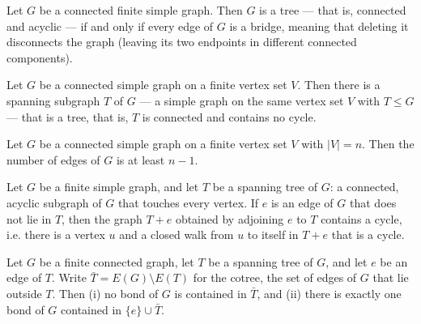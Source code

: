\begin{theorem}
\label{SimpleGraph.connected_isTree_iff_forall_edge_isBridge}
\leanok
Let $G$ be a connected finite simple graph. Then $G$ is a tree — that is, connected and
acyclic — if and only if every edge of $G$ is a bridge, meaning that deleting it
disconnects the graph (leaving its two endpoints in different connected components).
\end{theorem}

\begin{theorem}
\label{SimpleGraph.exists_spanningTree}
\leanok
Let $G$ be a connected simple graph on a finite vertex set $V$. Then there is a spanning
subgraph $T$ of $G$ — a simple graph on the same vertex set $V$ with $T \le G$ — that is
a tree, that is, $T$ is connected and contains no cycle.
\end{theorem}

\begin{theorem}
\label{SimpleGraph.connected_card_edgeFinset_ge}
\leanok
Let $G$ be a connected simple graph on a finite vertex set $V$ with $|V| = n$. Then the
number of edges of $G$ is at least $n - 1$.
\end{theorem}

\begin{theorem}
\label{SimpleGraph.spanningTree_add_edge_exists_cycle}
\leanok
Let $G$ be a finite simple graph, and let $T$ be a spanning tree of $G$: a connected,
acyclic subgraph of $G$ that touches every vertex. If $e$ is an edge of $G$ that does
not lie in $T$, then the graph $T + e$ obtained by adjoining $e$ to $T$ contains a
cycle, i.e. there is a vertex $u$ and a closed walk from $u$ to itself in $T + e$ that
is a cycle.
\end{theorem}

\begin{theorem}
\label{SimpleGraph.cotree_bond}
\leanok
{}
Let $G$ be a finite connected graph, let $T$ be a spanning tree of $G$, and let $e$ be
an edge of $T$. Write $\bar T = E(G) \setminus E(T)$ for the cotree, the set of edges of
$G$ that lie outside $T$. Then (i) no bond of $G$ is contained in $\bar T$, and (ii)
there is exactly one bond of $G$ contained in $\{e\} \cup \bar T$.
\end{theorem}


